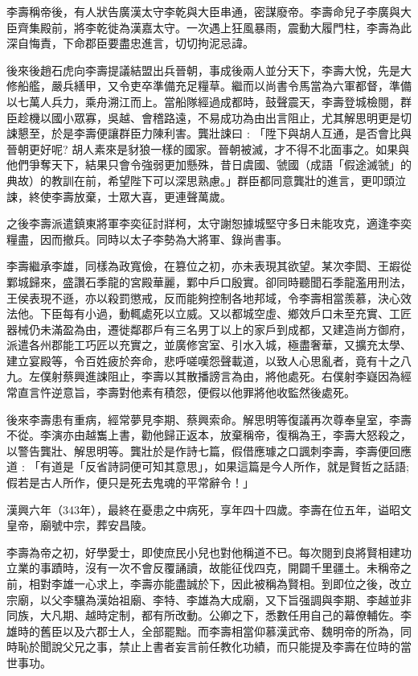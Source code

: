 李壽稱帝後，有人狀告廣漢太守李乾與大臣串通，密謀廢帝。李壽命兒子李廣與大臣齊集殿前，將李乾徙為漢嘉太守。一次遇上狂風暴雨，震動大履門柱，李壽為此深自悔責，下命郡臣要盡忠進言，切切拘泥忌諱。

後來後趙石虎向李壽提議結盟出兵晉朝，事成後兩人並分天下，李壽大悅，先是大修船艦，嚴兵繕甲，又令吏卒準備充足糧草。繼而以尚書令馬當為六軍都督，準備以七萬人兵力，乘舟溯江而上。當船隊經過成都時，鼓聲震天，李壽登城檢閱，群臣趁機以國小眾寡，吳越、會稽路遠，不易成功為由出言阻止，尤其解思明更是切誎懇至，於是李壽便讓群臣力陳利害。龔壯誎曰﹕「陞下與胡人互通，是否會比與晉朝更好呢? 胡人素來是豺狼一樣的國家。晉朝被滅，才不得不北面事之。如果與他們爭奪天下，結果只會令強弱更加懸殊，昔日虞國、虢國（成語「假途滅虢」的典故）的教訓在前，希望陛下可以深思熟慮。」群臣都同意龔壯的進言，更叩頭泣誎，終使李壽放棄，士眾大喜，更連聲萬歲。

之後李壽派遣鎮東將軍李奕征討牂柯，太守謝恕據城堅守多日未能攻克，適逢李奕糧盡，因而撤兵。同時以太子李勢為大將軍、錄尚書事。

李壽繼承李雄，同樣為政寬儉，在篡位之初，亦未表現其欲望。某次李閎、王嘏從鄴城歸來，盛讚石季龍的宮殿華麗，鄴中戶口殷實。卻同時聽聞石季龍濫用刑法，王侯表現不遜，亦以殺罰懲戒，反而能夠控制各地邦域，令李壽相當羨慕，決心效法他。下臣每有小過，動輒處死以立威。又以都城空虛、鄉效戶口未至充實、工匠器械仍未滿盈為由，遷徙鄰郡戶有三名男丁以上的家戶到成都，又建造尚方御府，派遣各州郡能工巧匠以充實之，並廣修宮室、引水入城，極盡奢華，又擴充太學、建立宴殿等，令百姓疲於奔命，悲呼嗟嘆怨聲載道，以致人心思亂者，竟有十之八九。左僕射蔡興進誎阻止，李壽以其散播謗言為由，將他處死。右僕射李嶷因為經常直言忤逆意旨，李壽對他素有積怨，便假以他罪將他收監然後處死。

後來李壽患有重病，經常夢見李期、蔡興索命。解思明等復議再次尊奉皇室，李壽不從。李演亦由越雟上書，勸他歸正返本，放棄稱帝，復稱為王，李壽大怒殺之，以警告龔壯、解思明等。龔壯於是作詩七篇，假借應璩之口諷刺李壽，李壽便回應道﹕「有道是「反省詩詞便可知其意思」，如果這篇是今人所作，就是賢哲之話語; 假若是古人所作，便只是死去鬼魂的平常辭令！」

漢興六年（343年），最終在憂患之中病死，享年四十四歲。李壽在位五年，谥昭文皇帝，廟號中宗，葬安昌陵。

李壽為帝之初，好學愛士，即使庶民小兒也對他稱道不已。每次閱到良將賢相建功立業的事蹟時，沒有一次不會反覆誦讀，故能征伐四克，開闢千里疆土。未稱帝之前，相對李雄一心求上，李壽亦能盡誠於下，因此被稱為賢相。到即位之後，改立宗廟，以父李驤為漢始祖廟、李特、李雄為大成廟，又下旨强調與李期、李越並非同族，大凡期、越時定制，都有所改動。公卿之下，悉數任用自己的幕僚輔佐。李雄時的舊臣以及六郡士人，全部罷黜。而李壽相當仰慕漢武帝、魏明帝的所為，同時恥於聞說父兄之事，禁止上書者妄言前任教化功績，而只能提及李壽在位時的當世事功。


